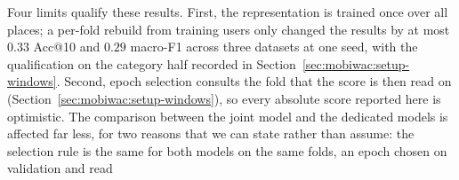 Four limits qualify these results. First, the representation is trained once over all places; a
per-fold rebuild from training users only changed the results by at most $0.33$ Acc@10 and $0.29$
macro-F1 across three datasets at one seed, with the qualification on the category half recorded in
Section~\ref{sec:mobiwac:setup-windows}.
Second, epoch selection consults the fold that the score is
then read on (Section~\ref{sec:mobiwac:setup-windows}), so every absolute score reported here is optimistic. The
comparison between the joint model and the dedicated models is affected far less, for two reasons that we can state
rather than assume: the selection rule is the same for both models on the same folds, an epoch chosen on validation and read
